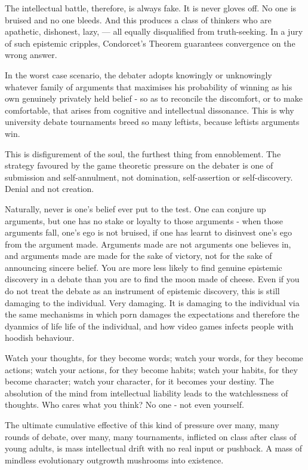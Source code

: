\begin{itemize}
The intellectual battle, therefore, is always fake. It is never gloves off. No one is bruised and no one bleeds. And this produces a class of thinkers who are apathetic, dishonest, lazy, — all equally disqualified from truth-seeking. In a jury of such epistemic cripples, Condorcet’s Theorem guarantees convergence on the wrong answer. 

In the worst case scenario, the debater adopts knowingly or unknowingly whatever family of arguments that maximises his probability of winning as his own genuinely privately held belief - so as to reconcile the discomfort, or to make comfortable, that arises from cognitive and intellectual dissonance. This is why university debate tournaments breed so many leftists, because leftists arguments win. 

This is disfigurement of the soul, the furthest thing from ennoblement. The strategy favoured by the game theoretic pressure on the debater is one of submission and self-annulment, not domination, self-assertion or self-discovery. Denial and not creation. 

Naturally, never is one's belief ever put to the test. One can conjure up arguments, but one has no stake or loyalty to those arguments - when those arguments fall, one's ego is not bruised, if one has learnt to disinvest one's ego from the argument made. Arguments made are not arguments one believes in, and arguments made are made for the sake of victory, not for the sake of announcing sincere belief. You are more less likely to find genuine epistemic discovery in a debate than you are to find the moon made of cheese. Even if you do not treat the debate as an instrument of epistemic discovery, this is still damaging to the individual. Very damaging. It is damaging to the individual via the same mechanisms in which porn damages the expectations and therefore the dyanmics of life life of the individual, and how video games infects people with hoodish behaviour. 

Watch your thoughts, for they become words; watch your words, for they become actions; watch your actions, for they become habits; watch your habits, for they become character; watch your character, for it becomes your destiny. The absolution of the mind from intellectual liability leads to the watchlessness of thoughts. Who cares what you think? No one - not even yourself. 
    
The ultimate cumulative effective of this kind of pressure over many, many rounds of debate, over many, many tournaments, inflicted on class after class of young adults, is mass intellectual drift with no real input or pushback. A mass of mindless evolutionary outgrowth mushrooms into existence. 


\end{itemize}
